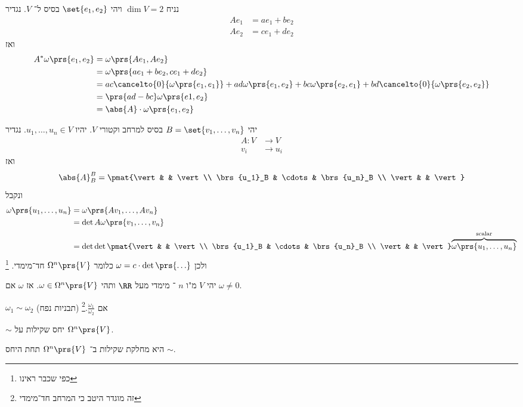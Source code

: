 \documentclass[a4paper,10pt,twoside,openany]{book}
\begin{document}
\begin{example}
נניח
$\dim V = 2$
ויהי
$\set{e_1, e_2}$
בסיס ל־%
$V$.
נגדיר
\begin{align*}
A e_1 &= a e_1 + be_2 \\
A e_2 &= ce_1 + de_2
\end{align*}
ואז
\begin{align*}
A^* \omega\prs{e_1, e_2} &= \omega\prs{A e_1, A e_2} \\
&= \omega\prs{a e_1 + be_2, ce_1 + de_2} \\
&= ac \cancelto{0}{\omega\prs{e_1, e_1}} + ad \omega\prs{e_1, e_2} + bc\omega\prs{e_2, e_1} + bd\cancelto{0}{\omega\prs{e_2, e_2}} \\
&= \prs{ad - bc} \omega\prs{e1, e_2} \\
&= \abs{A} \cdot \omega\prs{e_1, e_2}
\end{align*}
\end{example}
\begin{corollary}
יהי
$B = \set{v_1, \ldots, v_n}$
בסיס למרחב וקטורי
$V$.
יהיו
$u_1, \ldots, u_n \in V$.
נגדיר
\begin{align*}
A \colon V &\to V \\
v_i &\to u_i
\end{align*}
ואז
\[\abs{A}_B^B = \pmat{\vert & & \vert \\ \brs{u_1}_B & \cdots & \brs{u_n}_B \\ \vert & & \vert}\]
ונקבל
\begin{align*}
\omega\prs{u_1, \ldots, u_n} &= \omega\prs{A v_1, \ldots, A v_n} \\&= \det A \omega\prs{v_1, \ldots, v_n} \\&= \det \det \pmat{\vert & & \vert \\ \brs{u_1}_B & \cdots & \brs{u_n}_B \\ \vert & & \vert} \overset{\text{scalar}}{\overbrace{\omega\prs{u_1, \ldots, u_n}}}
\end{align*}
ולכן
$\omega = c \cdot \det\prs{\ldots}$
כלומר
$\Omega^n\prs{V}$
חד־מימדי.%
\footnote{כפי שכבר ראינו}
\end{corollary}
\begin{definition}
יהי
$V$
מ"ו
$n$%
־%
מימדי מעל
$\RR$
ותהי
$\omega \in \Omega^n\prs{V}$.
אז
$\omega$
אם
$\omega \neq 0$.
\end{definition}
\begin{definition}
$\omega_1 \sim \omega_2$
(תבניות נפח)
אם
$\frac{\omega_1}{\omega_2}$.\footnote{זה מוגדר היטב כי המרחב חד־מימדי}
\end{definition}
\begin{remark}
$\sim$
יחס שקילות על
$\Omega^n\prs{V}$.
\end{remark}
\begin{definition}
היא מחלקת שקילות ב־%
$\Omega^n\prs{V}$
תחת היחס
$\sim$.
\end{definition}
\end{document}
